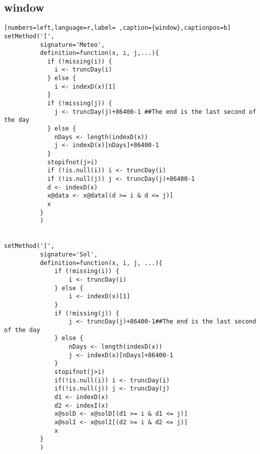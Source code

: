 \subsection{window}
\label{sec:org9b5886d}
\begin{lstlisting}[numbers=left,language=r,label= ,caption={window},captionpos=b]
setMethod('[',
          signature='Meteo',
          definition=function(x, i, j,...){
            if (!missing(i)) {
              i <- truncDay(i)
            } else {
              i <- indexD(x)[1]
            }
            if (!missing(j)) {
              j <- truncDay(j)+86400-1 ##The end is the last second of the day
            } else {
              nDays <- length(indexD(x))
              j <- indexD(x)[nDays]+86400-1
            }
            stopifnot(j>i)
            if (!is.null(i)) i <- truncDay(i)
            if (!is.null(j)) j <- truncDay(j)+86400-1
            d <- indexD(x)
            x@data <- x@data[(d >= i & d <= j)]
            x
          }
          )


setMethod('[',
          signature='Sol',
          definition=function(x, i, j, ...){
              if (!missing(i)) {
                  i <- truncDay(i)
              } else {
                  i <- indexD(x)[1]
              }
              if (!missing(j)) {
                  j <- truncDay(j)+86400-1##The end is the last second of the day
              } else {
                  nDays <- length(indexD(x))
                  j <- indexD(x)[nDays]+86400-1
              }
              stopifnot(j>i)
              if(!is.null(i)) i <- truncDay(i)
              if(!is.null(j)) j <- truncDay(j)
              d1 <- indexD(x)
              d2 <- indexI(x)
              x@solD <- x@solD[(d1 >= i & d1 <= j)]
              x@solI <- x@solI[(d2 >= i & d2 <= j)]
              x
          }
          )


\end{lstlisting}
